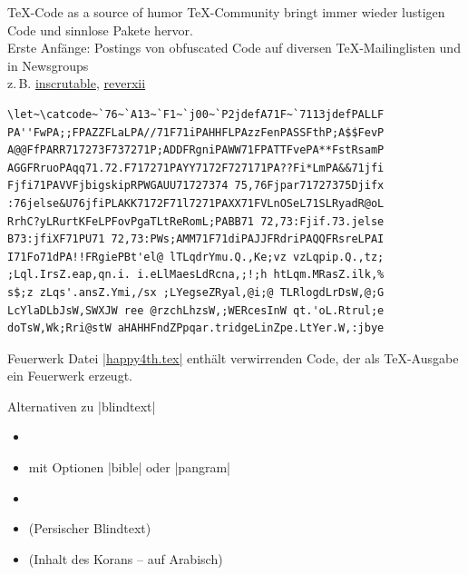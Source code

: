 \documentclass[
	vorläufig=false,
	datum=2021-12-22,
	titel={Witziges, Obskures und Sinnvolles…},
	web=false,
 	aspectratio=1610,
 	max,
]{../tex/latexkurs-slides}
\begin{document}
\begin{frame}{\textenglish{\TeX-Code as a source of humor}}
\TeX-Community bringt immer wieder lustigen Code und sinnlose Pakete hervor.\\Erste Anfänge: Postings von \textenglish{obfuscated Code} auf diversen \TeX-Mailinglisten und in Newsgroups\\ z.\,B. \href{http://www.ctan.org/pkg/inscrutable}{\alert{inscrutable}}, \href{http://www.ctan.org/pkg/reverxii}{\alert{reverxii}}
\end{frame}

\begin{frame}[fragile]
\thispagestyle{empty}
\begin{verbatim}
\let~\catcode~`76~`A13~`F1~`j00~`P2jdefA71F~`7113jdefPALLF
PA''FwPA;;FPAZZFLaLPA//71F71iPAHHFLPAzzFenPASSFthP;A$$FevP
A@@FfPARR717273F737271P;ADDFRgniPAWW71FPATTFvePA**FstRsamP
AGGFRruoPAqq71.72.F717271PAYY7172F727171PA??Fi*LmPA&&71jfi
Fjfi71PAVVFjbigskipRPWGAUU71727374 75,76Fjpar71727375Djifx
:76jelse&U76jfiPLAKK7172F71l7271PAXX71FVLnOSeL71SLRyadR@oL
RrhC?yLRurtKFeLPFovPgaTLtReRomL;PABB71 72,73:Fjif.73.jelse
B73:jfiXF71PU71 72,73:PWs;AMM71F71diPAJJFRdriPAQQFRsreLPAI
I71Fo71dPA!!FRgiePBt'el@ lTLqdrYmu.Q.,Ke;vz vzLqpip.Q.,tz;
;Lql.IrsZ.eap,qn.i. i.eLlMaesLdRcna,;!;h htLqm.MRasZ.ilk,%
s$;z zLqs'.ansZ.Ymi,/sx ;LYegseZRyal,@i;@ TLRlogdLrDsW,@;G
LcYlaDLbJsW,SWXJW ree @rzchLhzsW,;WERcesInW qt.'oL.Rtrul;e
doTsW,Wk;Rri@stW aHAHHFndZPpqar.tridgeLinZpe.LtYer.W,:jbye
\end{verbatim}
\end{frame}

\begin{frame}{Feuerwerk}
Datei \href{http://www.ctan.org/pkg/happy4th}{|happy4th.tex|} enthält verwirrenden Code, der als \TeX-Ausgabe ein Feuerwerk erzeugt.

\end{frame}

\begin{frame}[t,fragile]{Alternativen zu |blindtext|}
\begin{itemize}
\item {}
\item {} mit Optionen |bible| oder |pangram|
\item {}
\item {} (Persischer Blindtext)
\item {} (Inhalt des Korans – auf Arabisch)
\end{itemize}
\end{frame}
\end{document}
